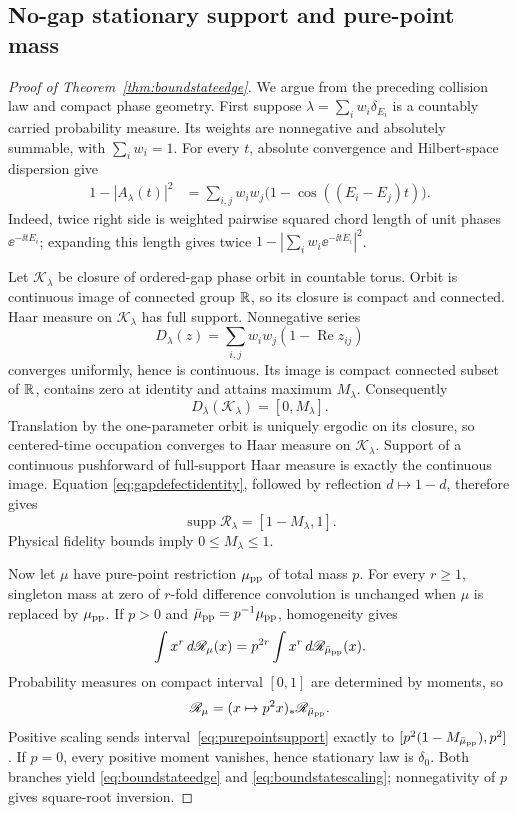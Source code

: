 \subsection{No-gap stationary support and pure-point mass}

\begin{proof}[Proof of Theorem~\ref{thm:boundstateedge}]
We argue from the preceding collision law and compact phase geometry.
First suppose
$\lambda=\sum_iw_i\delta_{E_i}$ is a countably carried probability measure.  Its
weights are nonnegative and absolutely summable, with $\sum_iw_i=1$.  For
every $t$, absolute convergence and Hilbert-space dispersion give
\begin{align}
 1-|A_\lambda(t)|^2
 &=\sum_{i,j}w_iw_j
   \bigl(1-\cos((E_i-E_j)t)\bigr).                  \label{eq:gapdefectidentity}
\end{align}
Indeed, twice right side is weighted pairwise squared chord length of unit
phases $\ee^{-\ii tE_i}$; expanding this length gives twice
$1-|\sum_iw_i\ee^{-\ii tE_i}|^2$.

Let $\mathcal K_\lambda$ be closure of ordered-gap phase orbit in countable
torus.  Orbit is continuous image of connected group $\mathbb R$, so its closure is
compact and connected.  Haar measure on $\mathcal K_\lambda$ has full support.
Nonnegative series
\[
 D_\lambda(z)=\sum_{i,j}w_iw_j(1-\operatorname{Re}z_{ij})
\]
converges uniformly, hence is continuous.  Its image is compact connected
subset of $\mathbb R$, contains zero at identity and attains maximum $M_\lambda$.
Consequently
\[
 D_\lambda(\mathcal K_\lambda)=[0,M_\lambda].
\]
Translation by the one-parameter orbit is uniquely ergodic on its closure,
so centered-time occupation converges to Haar measure on
$\mathcal K_\lambda$.  Support of a continuous pushforward of full-support
Haar measure is exactly the continuous image.  Equation
\eqref{eq:gapdefectidentity}, followed by
reflection $d\mapsto1-d$, therefore gives
\begin{equation}
 \operatorname{supp}\mathscr R_\lambda=[1-M_\lambda,1]. \label{eq:purepointsupport}
\end{equation}
Physical fidelity bounds imply $0\le M_\lambda\le1$.

Now let $\mu$ have pure-point restriction $\mu_{\rm pp}$ of total mass $p$.
For every $r\ge1$, singleton mass at zero of $r$-fold difference
convolution is unchanged when $\mu$ is replaced by $\mu_{\rm pp}$.  If
$p>0$ and $\bar\mu_{\rm pp}=p^{-1}\mu_{\rm pp}$, homogeneity gives
\[
 \int x^r\,d\mathscr R_\mu(x)
 =p^{2r}\int x^r\,d\mathscr R_{\bar\mu_{\rm pp}}(x).
\]
Probability measures on compact interval $[0,1]$ are determined by moments,
so
\[
 \mathscr R_\mu=(x\mapsto p^2x)_*
   \mathscr R_{\bar\mu_{\rm pp}}.
\]
Positive scaling sends interval~\eqref{eq:purepointsupport} exactly to
$[p^2(1-M_{\bar\mu_{\rm pp}}),p^2]$.  If $p=0$, every positive moment
vanishes, hence stationary law is $\delta_0$.  Both branches yield
\eqref{eq:boundstateedge} and \eqref{eq:boundstatescaling}; nonnegativity of
$p$ gives square-root inversion.
\end{proof}

